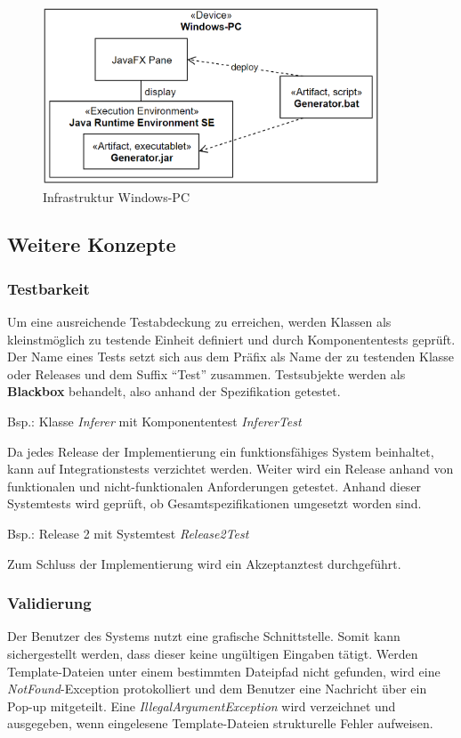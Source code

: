 \begin{figure}[H]
    \centering
    \includegraphics[width=10cm]{../images/Verteilungssicht.PNG}
    \caption{Infrastruktur Windows-PC}
\end{figure}

\subsection{Weitere Konzepte}

\subsubsection{Testbarkeit}
Um eine ausreichende Testabdeckung zu erreichen, werden Klassen als kleinstmöglich zu testende Einheit definiert
und durch Komponententests geprüft.
Der Name eines Tests setzt sich aus dem Präfix als Name der zu testenden Klasse oder Releases und dem Suffix
"`Test"'
zusammen.
Testsubjekte werden als \textbf{Blackbox} behandelt, also anhand der Spezifikation getestet.
\begin{center}
    Bsp.: Klasse \textit{Inferer} mit Komponententest \textit{InfererTest}
\end{center}
Da jedes Release der Implementierung ein funktionsfähiges System beinhaltet, kann auf Integrationstests
verzichtet werden.
Weiter wird ein Release anhand von funktionalen und nicht-funktionalen Anforderungen getestet.
Anhand dieser Systemtests wird geprüft, ob Gesamtspezifikationen umgesetzt worden sind.
\begin{center}
    Bsp.: Release 2 mit Systemtest \textit{Release2Test}
\end{center}
Zum Schluss der Implementierung wird ein Akzeptanztest durchgeführt.

\subsubsection{Validierung}
Der Benutzer des Systems nutzt eine grafische Schnittstelle.
Somit kann sichergestellt werden, dass dieser keine ungültigen Eingaben tätigt.
Werden Template-Dateien unter einem bestimmten Dateipfad nicht gefunden, wird eine \textit{NotFound}-Exception
protokolliert und dem Benutzer eine Nachricht über ein Pop-up mitgeteilt.
Eine \textit{IllegalArgumentException} wird verzeichnet und ausgegeben, wenn eingelesene Template-Dateien
strukturelle Fehler aufweisen.


